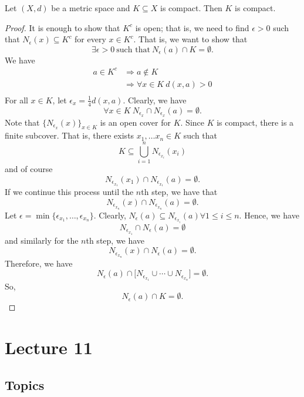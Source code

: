 \documentclass[a4paper]{report}
\begin{document}
\begin{theorem}
Let \( (X,d) \) be a metric space and \( K \subseteq X   \) is compact. Then \(  K  \) is compact.
\end{theorem}
\begin{proof}
It is enough to show that \( K^{c} \) is open; that is, we need to find \( \epsilon > 0 \) such that \( {N}_{\epsilon}(x) \subseteq K^{c} \) for every \( x \in K^{c} \). That is, we want to show that   
\[ \exists \epsilon > 0 \ \text{such that} \ {N}_{\epsilon}(a) \cap K = \emptyset.   \]
We have 
\begin{align*}
    a \in K^{c} &\Longrightarrow a \notin K  \\
                &\Longrightarrow \forall x \in K \ d(x,a) > 0 \\
\end{align*}
For all \( x \in K  \), let \( {\epsilon}_{x} = \frac{ 1 }{ 4 }  d(x,a) \). Clearly, we have 
\[ \forall x \in K \ {N}_{{\epsilon}_{x}} \cap {N}_{{\epsilon}_{x}}(a) = \emptyset.  \]
Note that \( \{ {N}_{{\epsilon}_{x}}(x) \}_{x \in K} \) is an open cover for \( K   \). Since \(  K  \) is compact, there is a finite subcover. That is, there exists \( {x}_{1}, \dots {x}_{n} \in  K  \) such that 
\[  K \subseteq  \bigcup_{ i =1  }^{ n }  {N}_{{\epsilon}_{{x}_{i}}}({x}_{i}) \]
and of course 
\[  {N}_{{\epsilon}_{{x}_{1}}} ({x}_{1}) \cap {N}_{{\epsilon}_{{x}_{1}}}(a) = \emptyset. \]
If we continue this process until the \( n \)th step, we have that 
\[  {N}_{{\epsilon}_{{x}_{n}}}(x) \cap {N}_{{\epsilon}_{{x}_{n}}}(a) = \emptyset. \]
Let \( \epsilon = \min \{ {\epsilon}_{{x}_{1}}, \dots, {\epsilon}_{{x}_{n}}  \}.   \)
Clearly, \( {N}_{\epsilon}(a) \subseteq  {N}_{{\epsilon}_{{x}_{i}}} (a) \forall 1 \leq i \leq n  \). Hence, we have 
\[  {N}_{{\epsilon}_{{x}_{1}}} \cap {N}_{\epsilon}(a) = \emptyset \]
and similarly for the \( n \)th step, we have 
\[  {N}_{{\epsilon}_{{x}_{n}}}(x) \cap {N}_{\epsilon}(a) = \emptyset. \]
Therefore, we have 
\[  {N}_{\epsilon}(a) \cap \Big[ {N}_{{\epsilon}_{{x}_{1}}} \cup \cdots \cup {N}_{{\epsilon}_{{x}_{n}}} \Big] = \emptyset. \]
So, 
\[  {N}_{\epsilon}(a) \cap K = \emptyset. \]

\end{proof}

\section{Lecture 11}


\subsection{Topics}
\end{document}
